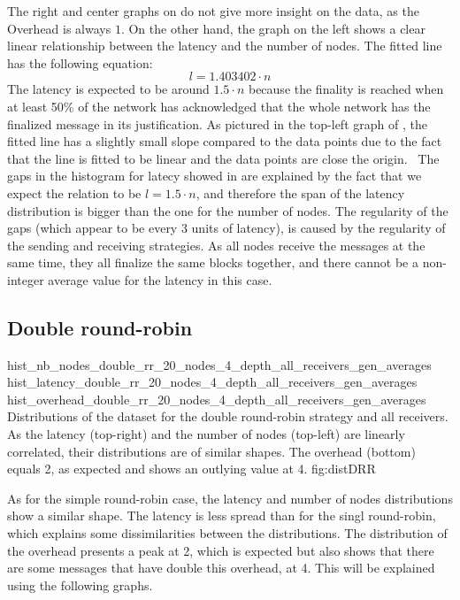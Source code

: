 The right and center graphs on  do not give more insight on the
data, as the Overhead is always \(1\). On the other hand, the graph on the left
shows a clear linear relationship between the latency and the number of nodes.
The fitted line has the following equation:
\[l = 1.403402\cdot n\]
The latency is expected to be around \(1.5\cdot n\) because the finality is
reached when at least 50\% of the network has acknowledged that the whole
network has the finalized message in its justification. As pictured in the
top-left graph of , the fitted line has a slightly small
slope compared to the data points due to the fact that the line is fitted to be
linear and the data points are close the origin. \
The gaps in the histogram for latecy showed in  are explained by the fact
that we expect the relation to be \(l = 1.5\cdot n\), and therefore the span of
the latency distribution is bigger than the one for the number of nodes. The
regularity of the gaps (which appear to be every 3 units of latency), is caused
by the regularity of the sending and receiving strategies. As all nodes receive
the messages at the same time, they all finalize the same blocks together, and
there cannot be a non-integer average value for the latency in this case.

\FloatBarrier
\subsection{Double round-robin}
\triplefigure
    {hist_nb_nodes_double_rr_20_nodes_4_depth_all_receivers_gen_averages}
    {hist_latency_double_rr_20_nodes_4_depth_all_receivers_gen_averages}
    {hist_overhead_double_rr_20_nodes_4_depth_all_receivers_gen_averages}
    {Distributions of the dataset for the double round-robin strategy and all
    receivers. As the latency (top-right) and the number of nodes (top-left) are
    linearly correlated, their distributions are of similar shapes. The
    overhead (bottom) equals 2, as expected and shows an outlying value at 4.}
    {fig:distDRR}

As for the simple round-robin case, the latency and number of nodes
distributions show a similar shape. The latency is less spread than for the
singl round-robin, which explains some dissimilarities between the
distributions. The distribution of the overhead presents a peak at 2, which is
expected but also shows that there are some messages that have double this
overhead, at 4. This will be explained using the following graphs. \todo{explain
outliers}

